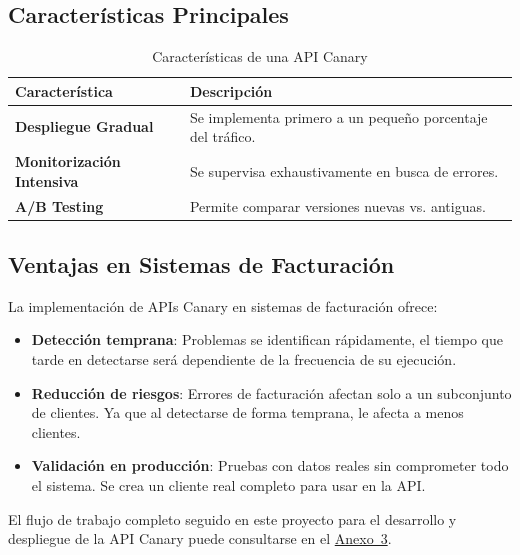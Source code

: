 \subsection{Características Principales}

\begin{table}[h!]
    \centering
    \begin{tabular}{|p{}|p{}|}
        \hline
        \textbf{Característica}           & \textbf{Descripción}                                       \\
        \hline
        \hline
        \textbf{Despliegue Gradual}       & Se implementa primero a un pequeño porcentaje del tráfico. \\
        \hline
        \textbf{Monitorización Intensiva} & Se supervisa exhaustivamente en busca de errores.          \\
        \hline
        \textbf{A/B Testing}              & Permite comparar versiones nuevas vs. antiguas.            \\
        \hline
    \end{tabular}
    \caption{Características de una API Canary}
    \label{tab:api-canary-caracteristicas}
\end{table}

\subsection{Ventajas en Sistemas de Facturación}

La implementación de APIs Canary en sistemas de facturación ofrece:

\begin{itemize}
    \item \textbf{Detección temprana}: Problemas se identifican rápidamente, el tiempo que tarde en detectarse será dependiente de la frecuencia de su ejecución.
    \item \textbf{Reducción de riesgos}: Errores de facturación afectan solo a un subconjunto de clientes. Ya que al detectarse de forma temprana, le afecta a menos clientes.
    \item \textbf{Validación en producción}: Pruebas con datos reales sin comprometer todo el sistema. Se crea un cliente real completo para usar en la API.
\end{itemize}

El flujo de trabajo completo seguido en este proyecto para el desarrollo y despliegue de la API Canary puede consultarse en el \hyperref[anexo:flujo-canary]{Anexo~3}.


